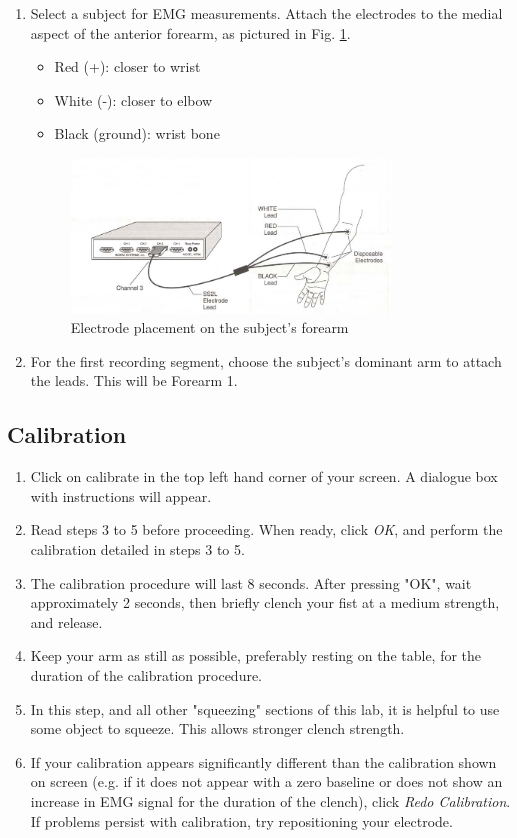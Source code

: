 \documentclass{article}
\begin{document}
\begin{enumerate}
	\item Select a subject for EMG measurements. Attach the electrodes to the medial aspect of the anterior forearm, as pictured in Fig. \ref{forearm}.
		\begin{itemize}
			\item Red (+): closer to wrist
			\item White (-): closer to elbow
			\item Black (ground): wrist bone
		\end{itemize}
	
		\begin{figure}[h]
	\includegraphics[width=0.8\textwidth]{../images/EMG_I_7.jpg}
		\centering
		\caption{Electrode placement on the subject's forearm}
		\label{forearm}
		\end{figure}

	\item For the first recording segment, choose the subject's dominant arm to attach the leads. This will be Forearm 1.
\end{enumerate}

\subsection*{Calibration}
\begin{enumerate}
	\item Click on calibrate in the top left hand corner of your screen. A dialogue box with instructions will appear.
	\item Read steps 3 to 5 before proceeding. When ready, click \textit{OK}, and perform the calibration detailed in steps 3 to 5.
	\item The calibration procedure will last 8 seconds. After pressing "OK", wait approximately 2 seconds, then briefly clench your fist at a medium strength, and release.
	\item Keep your arm as still as possible, preferably resting on the table, for the duration of the calibration procedure.
	\item In this step, and all other "squeezing" sections of this lab, it is helpful to use some object to squeeze. This allows stronger clench strength.
	\item If your calibration appears significantly different than the calibration shown on screen (e.g. if it does not appear with a zero baseline or does not show an increase in EMG signal for the duration of the clench), click \textit{Redo Calibration}. If problems persist with calibration, try repositioning your electrode.
\end{enumerate}
\end{document}
